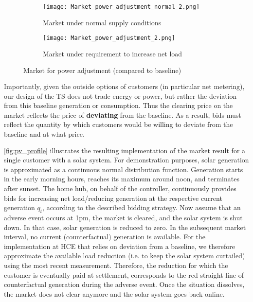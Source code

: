 \begin{figure}[h]\label{fig:baseline}
  \begin{subfigure}[t]{0.485\linewidth}
    \centering\texttt{[image: Market\_power\_adjustment\_normal\_2.png]}
    \caption{Market under normal supply conditions}
    \label{fig:lem_adjustment_normal}
  \end{subfigure}\hspace{0.5cm}
  \begin{subfigure}[t]{.485\linewidth}
    \centering\texttt{[image: Market\_power\_adjustment\_2.png]}
    \caption{Market under requirement to increase net load} 
    \label{fig:lem_adjustment}
  \end{subfigure}
\caption{Market for power adjustment (compared to baseline)}
\end{figure}

Importantly, given the outside options of customers (in particular net metering), our design of the TS does not trade energy or power, but rather the deviation from this baseline generation or consumption. Thus the clearing price on the market reflects the price of \textbf{deviating} from the baseline. As a result, bids must reflect the quantity by which customers would be willing to deviate from the baseline and at what price. 

\cref{fig:pv_profile} illustrates the resulting implementation of the market result for a single customer with a solar system. For demonstration purposes, solar generation is approximated as a continuous normal distribution function. Generation starts in the early morning hours, reaches its maximum around noon, and terminates after sunset. The home hub, on behalf of the controller, continuously provides bids for increasing net load/reducing generation at the respective current generation $q_t$, according to the described bidding strategy. Now assume that an adverse event occurs at 1pm, the market is cleared, and the solar system is shut down. In that case, solar generation is reduced to zero. In the subsequent market interval, no current (counterfactual) generation is available. For the implementation at HCE that relies on deviation from a baseline, we therefore approximate the available load reduction (i.e. to keep the solar system curtailed) using the most recent measurement. Therefore, the reduction for which the customer is eventually paid at settlement, corresponds to the red straight line of counterfactual generation during the adverse event. Once the situation dissolves, the market does not clear anymore and the solar system goes back online.

